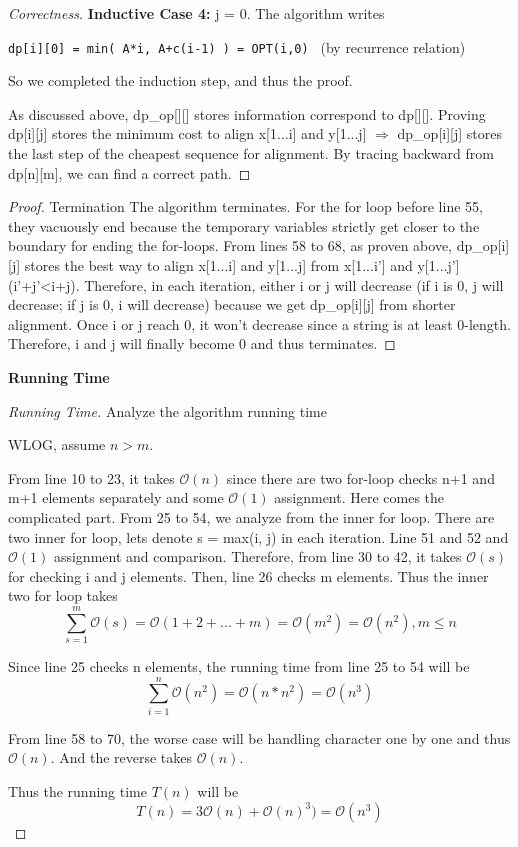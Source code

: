 \documentclass[openany]{article}
\begin{document}
\begin{proof}[Correctness]{}
     \textbf{Inductive Case 4:} j = 0. The algorithm writes 
    \begin{center}
        \texttt{dp[i][0] = min( A*i, A+c(i-1) ) = OPT(i,0) } (by recurrence relation)
    \end{center}
    
    So we completed the induction step, and thus the proof.
    
    As discussed above, dp\_op[][] stores information correspond to dp[][]. Proving dp[i][j] stores the minimum cost to align x[1...i] and y[1...j] $\Rightarrow$ dp\_op[i][j] stores the last step of the cheapest sequence for alignment. By tracing backward from dp[n][m], we can find a correct path.
    
\end{proof}
\begin{proof}{Termination}
        The algorithm terminates. For the for loop before line 55, they vacuously end because the temporary variables strictly get closer to the boundary for ending the for-loops. From lines 58 to 68, as proven above, dp\_op[i][j] stores the best way to align x[1...i] and y[1...j] from x[1...i'] and y[1...j'] (i'+j'<i+j). Therefore, in each iteration, either i or j will decrease (if i is 0, j will decrease; if j is 0, i will decrease) because we get dp\_op[i][j] from shorter alignment. Once i or j reach 0, it won't decrease since a string is at least 0-length. Therefore, i and j will finally become 0 and thus terminates.
\end{proof}

\textbf{Running Time}

\begin{proof}[Running Time]{Analyze the algorithm running time}
    	\renewcommand{\qedsymbol}{}
    	
    	WLOG, assume $n > m$.
    	
    	From line 10 to 23, it takes $\mathcal{O}(n)$ since there are two for-loop checks n+1 and m+1 elements separately and some $\mathcal{O}(1)$ assignment. Here comes the complicated part. From 25 to 54, we analyze from the inner for loop. There are two inner for loop, lets denote s = max(i, j) in each iteration. Line 51 and 52 and $\mathcal{O}(1)$ assignment and comparison. Therefore, from line 30 to 42, it takes $\mathcal{O}(s)$ for checking i and j elements. Then, line 26 checks m elements. Thus the inner two for loop takes
    	\[\sum_{s=1}^{m}\mathcal{O}(s) = \mathcal{O}(1+2+...+m) = \mathcal{O}(m^2) = \mathcal{O}(n^2), m\leq n\]
    	
    	Since line 25 checks n elements, the running time from line 25 to 54 will be \[\sum_{i=1}^{n}\mathcal{O}(n^2) = \mathcal{O}(n*n^2)=\mathcal{O}(n^3)\]
    	
    	From line 58 to 70, the worse case will be handling character one by one and thus $\mathcal{O}(n)$. And the reverse takes $\mathcal{O}(n)$.
    	
    	Thus the running time $T(n)$ will be \[T(n)=3\mathcal{O}(n)+\mathcal{O}(n)^3)=\mathcal{O}(n^3)\]
\end{proof}
\end{document}
